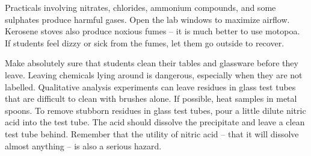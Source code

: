 Practicals involving nitrates, chlorides, ammonium compounds, and some sulphates produce harmful gases. Open the lab windows to maximize airflow. Kerosene stoves also produce noxious fumes -- it is much better to use motopoa. If students feel dizzy or sick from the fumes, let them go outside to recover.

Make absolutely sure that students clean their tables and glassware before they leave. Leaving chemicals lying around is dangerous, especially when they are not labelled. Qualitative analysis experiments can leave residues in glass test tubes that are difficult to clean with brushes alone. If possible, heat samples in metal spoons. To remove stubborn residues in glass test tubes, pour a little dilute nitric acid into the test tube. The acid should dissolve the precipitate and leave a clean test tube behind. Remember that the utility of nitric acid -- 
that it will dissolve almost anything -- is also a serious hazard.


